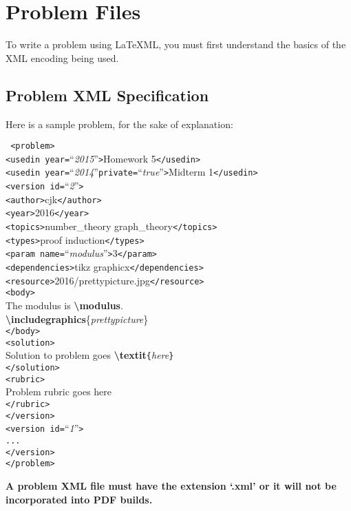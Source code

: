 \section{Problem Files}
  To write a problem using \LaTeX ML, you must first understand the basics 
  of the XML encoding being used.
  
  \subsection{Problem XML Specification}
    Here is a sample problem, for the sake of explanation:
{
  \newcommand\TB{\hspace*{1em}}
    \begin{mdframed}
      \texttt{
<problem>\\
\TB<usedin year=}``\textit{2015}''\texttt{>}Homework 5\texttt{</usedin>\\
\TB<usedin year=}``\textit{2014}''\texttt{private=}``\textit{true}''\texttt{>}Midterm 1\texttt{</usedin>\\
\TB<version id=}``\textit{2}''\texttt{>\\
\TB\TB<author>}cjk\texttt{</author>\\
\TB\TB<year>}2016\texttt{</year>\\
\TB\TB<topics>}number\_theory graph\_theory\texttt{</topics>\\
\TB\TB<types>}proof induction\texttt{</types>\\
\TB\TB<param name=}``\textit{modulus}''\texttt{>}3\texttt{</param>\\
\TB\TB<dependencies>}tikz graphicx\texttt{</dependencies>\\
\TB\TB<resource>}2016/prettypicture.jpg\texttt{</resource>\\
\TB\TB<body>}\\
\TB\TB\TB The modulus is \textbf{\textbackslash modulus}.\\
\TB\TB\TB \textbf{\textbackslash includegraphics}\{\textit{prettypicture}\}\\
\TB\TB\texttt{</body>\\
\TB\TB<solution>}\\
\TB\TB\TB Solution to problem goes 
  \textbf{\textbackslash textit}\texttt{\{}\textit{here}\texttt{\}}\\
\TB\TB\texttt{</solution>\\
\TB\TB<rubric>\\
\TB\TB\TB}Problem rubric goes here\texttt{\\
\TB\TB</rubric>\\
\TB</version>\\
\TB<version id=}``\textit{1}''\texttt{>\\
\TB\TB...\\
\TB</version>\\
</problem>
}
    \end{mdframed}
}
    \textbf{A problem XML file must have the extension `.xml' or it will 
    not be incorporated into PDF builds.}
    
